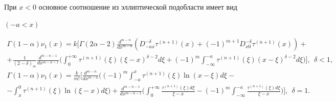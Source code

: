 \begin{lem} 


При $x<0$ основное соотношение из эллиптической подобласти имеет вид \linebreak


$(-a<x)$ 


\begin{gather*} 


\Gamma(1-\alpha)\nu_1(x)=k\bigg[\Gamma(2\alpha-2) 


\frac{d^{m-n}}{dx^{m-n}}(D^{-\delta}_{-ax}\tau^{(n+1)}(x) 


+(-1)^{m+1}D^{-\delta}_{x0}\tau^{(n+1)}(x))+\\ 


% 


+\frac{1}{(2-\delta)_m}\frac{d^{m-n-1}}{dx^{m-n-1}}\bigg( 


\int^{+\infty}_0 \tau^{(n+1)}(\xi)(\xi-x)^{\delta-2}d\xi+ 


(-1)^m\int^{-a}_{-\infty}\tau^{(n+1)}(\xi)(x-\xi)^{\delta-2} 


d\xi\bigg)\bigg],\ \ \delta<1,\\ 


% 


\Gamma(1-\alpha)\nu_1(x)=\frac{k}{m!}\bigg[ 


\frac{d^{m-n}}{dx^{m-n}}\bigg((-1)^m\int^x_{-a} 


\tau^{(n+1)}(\xi)\ln(x-\xi)d\xi-\\ 


% 


-\int^0_x \tau^{(n+1)}(\xi)\ln(\xi-x)d\xi\bigg)+ 


\frac{d^{m-n-1}}{dx^{m-n-1}}\bigg(\int^{+\infty}_0 


\frac{\tau^{(n+1)}(\xi)d\xi}{\xi-x}-(-1)^m\int^{-a}_{-\infty} 


\frac{\tau^{(n+1)}(\xi)d\xi}{\xi-x}\bigg)\bigg],\ \ \delta=1.


\end{gather*} 


\end{lem} 


 


 



